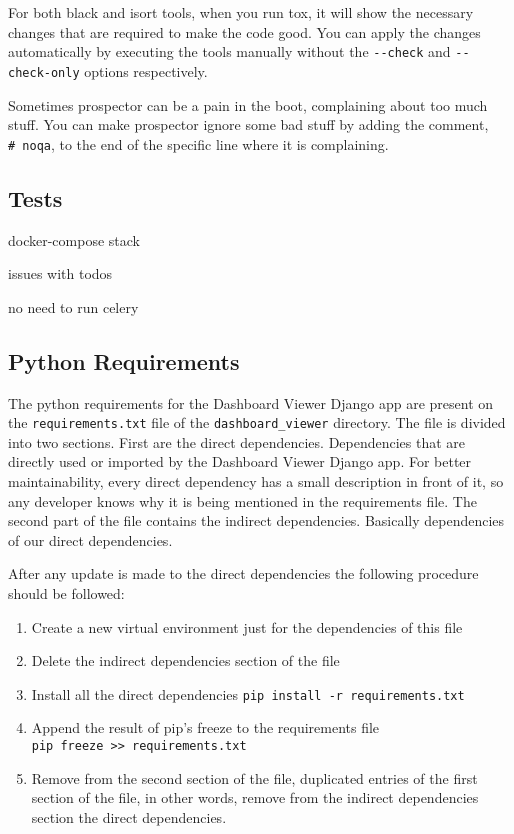 \documentclass[
]{book}
\providecommand{\tightlist}{%
  \setlength{\itemsep}{0pt}\setlength{\parskip}{0pt}}
\begin{document}
For both black and isort tools, when you run tox, it will show the necessary changes that are required to make the code good.
You can apply the changes automatically by executing the tools manually without the \texttt{-\/-check} and \texttt{-\/-check-only} options respectively.

Sometimes prospector can be a pain in the boot, complaining about too much stuff.
You can make prospector ignore some bad stuff by adding the comment, \texttt{\#\ noqa}, to the end of the specific line where it is complaining.

\hypertarget{tests}{%
\subsection*{Tests}\label{tests}}

docker-compose stack

issues with todos

no need to run celery

\hypertarget{python-requirements}{%
\subsection*{Python Requirements}\label{python-requirements}}

The python requirements for the Dashboard Viewer Django app are present on the \texttt{requirements.txt} file of the \texttt{dashboard\_viewer} directory.
The file is divided into two sections.
First are the direct dependencies.
Dependencies that are directly used or imported by the Dashboard Viewer Django app.
For better maintainability, every direct dependency has a small description in front of it, so any developer knows why it is being mentioned in the requirements file.
The second part of the file contains the indirect dependencies.
Basically dependencies of our direct dependencies.

After any update is made to the direct dependencies the following procedure should be followed:

\begin{enumerate}
\def\labelenumi{\arabic{enumi}.}
\tightlist
\item
  Create a new virtual environment just for the dependencies of this file
\item
  Delete the indirect dependencies section of the file
\item
  Install all the direct dependencies \texttt{pip\ install\ -r\ requirements.txt}
\item
  Append the result of pip's freeze to the requirements file \texttt{pip\ freeze\ \textgreater{}\textgreater{}\ requirements.txt}
\item
  Remove from the second section of the file, duplicated entries of the first section of the file, in other words, remove from the indirect dependencies section the direct dependencies.
\end{enumerate}
\end{document}
